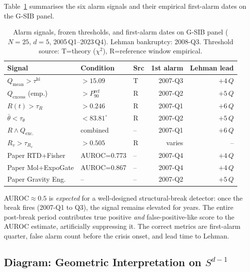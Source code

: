 \documentclass[journal]{IEEEtran}
\begin{document}
Table~\ref{tab:alarms} summarises the six alarm signals and their empirical
first-alarm dates on the G-SIB panel.

\begin{table}[h]
\centering
\caption{Alarm signals, frozen thresholds, and first-alarm dates on
  G-SIB panel ($N{=}25$, $d{=}5$, 2005\,Q1--2023\,Q4).  Lehman bankruptcy:
  2008-Q3.  Threshold source: T=theory ($\chi^2$), R=reference window empirical.}
\label{tab:alarms}
\renewcommand{\arraystretch}{1.18}
\begin{tabular}{@{}lllrr@{}}
\toprule
\textbf{Signal} & \textbf{Condition} & \textbf{Src} &
  \textbf{1st alarm} & \textbf{Lehman lead} \\
\midrule
$Q_{\mathrm{mean}} > \tau^{\mathrm{hi}}$ & $>15.09$         & T & 2007-Q3 & $+4\,Q$ \\
$Q_{\mathrm{excess}}$ (emp.) & $>P_{90}^{\mathrm{ref}}$ & R & 2007-Q2 & $+5\,Q$ \\
$R(t) > \tau_R$               & $>0.246$          & R & 2007-Q1 & $+6\,Q$ \\
$\bar\theta < \tau_\theta$    & $<83.81^\circ$   & R & 2007-Q2 & $+5\,Q$ \\
$R \wedge Q_{\mathrm{exc.}}$  & combined         & -- & 2007-Q1 & $+6\,Q$ \\
$R_v > \tau_{R_v}$            & $>0.505$          & R & varies  & -- \\
\midrule
Paper RTD+Fisher    & AUROC=0.773 & -- & 2007-Q4 & $+4\,Q$ \\
Paper Mol+ExpoGate  & AUROC=0.867 & -- & 2007-Q4 & $+4\,Q$ \\
Paper Gravity Eng.  & --          & -- & 2007-Q2 & $+5\,Q$ \\
\bottomrule
\end{tabular}
\end{table}

\begin{remark}
AUROC$\approx 0.5$ is \emph{expected} for a well-designed structural-break
detector: once the break fires (2007-Q1 to Q3), the signal remains elevated
for years.  The entire post-break period contributes true positive \emph{and}
false-positive-like score to the AUROC estimate, artificially suppressing it.
The correct metrics are first-alarm quarter, false alarm count before the
crisis onset, and lead time to Lehman.
\end{remark}

\subsection{Diagram: Geometric Interpretation on $S^{d-1}$}
\label{ssec:diagram}
\end{document}
